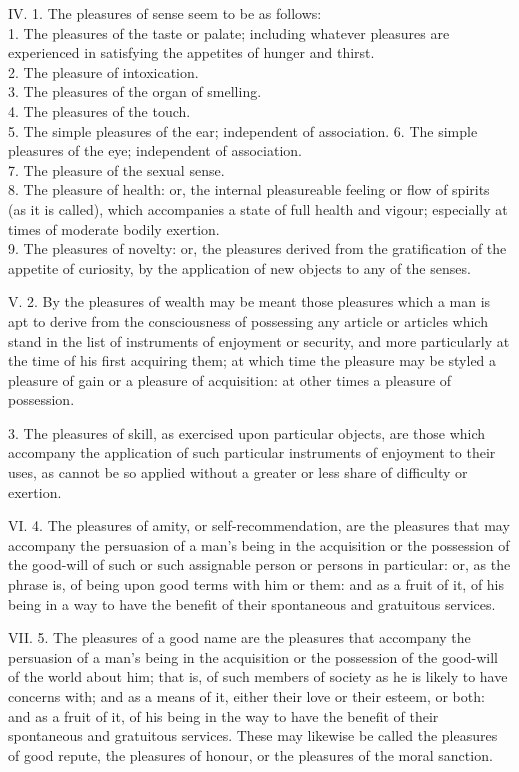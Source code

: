 \documentclass[12pt]{report}
\begin{document}
IV. 1. The pleasures of sense seem to be as follows:\\
1. The pleasures of the taste or palate; including whatever pleasures
are experienced in satisfying the appetites of hunger and thirst.\\
2. The pleasure of intoxication.\\
3. The pleasures of the organ of smelling.\\
4. The pleasures of the touch.\\
5. The simple pleasures of the ear; independent of association. 6. The
simple pleasures of the eye; independent of association.\\
7. The pleasure of the sexual sense.\\
8. The pleasure of health: or, the internal pleasureable feeling or flow
of spirits (as it is called), which accompanies a state of full health
and vigour; especially at times of moderate bodily exertion.\\
9. The pleasures of novelty: or, the pleasures derived from the
gratification of the appetite of curiosity, by the application of new
objects to any of the senses.

V. 2. By the pleasures of wealth may be meant those pleasures which a
man is apt to derive from the consciousness of possessing any article or
articles which stand in the list of instruments of enjoyment or
security, and more particularly at the time of his first acquiring them;
at which time the pleasure may be styled a pleasure of gain or a
pleasure of acquisition: at other times a pleasure of possession.

3. The pleasures of skill, as exercised upon particular objects, are
those which accompany the application of such particular instruments of
enjoyment to their uses, as cannot be so applied without a greater or
less share of difficulty or exertion.

VI. 4. The pleasures of amity, or self-recommendation, are the pleasures
that may accompany the persuasion of a man's being in the acquisition or
the possession of the good-will of such or such assignable person or
persons in particular: or, as the phrase is, of being upon good terms
with him or them: and as a fruit of it, of his being in a way to have
the benefit of their spontaneous and gratuitous services.

VII. 5. The pleasures of a good name are the pleasures that accompany
the persuasion of a man's being in the acquisition or the possession of
the good-will of the world about him; that is, of such members of
society as he is likely to have concerns with; and as a means of it,
either their love or their esteem, or both: and as a fruit of it, of his
being in the way to have the benefit of their spontaneous and gratuitous
services. These may likewise be called the pleasures of good repute, the
pleasures of honour, or the pleasures of the moral sanction.
\end{document}
